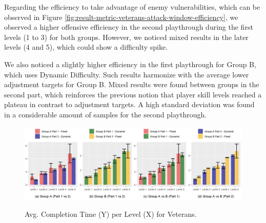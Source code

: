 Regarding the efficiency to take advantage of enemy vulnerabilities, which can be observed in Figure \ref{fig:result-metric-veterans-attack-window-efficiency}, we observed a higher offensive efficiency in the second playthrough during the first levels (1 to 3) for both groups. However, we noticed mixed results in the later levels (4 and 5), which could show a difficulty spike.

We also noticed a slightly higher efficiency in the first playthrough for Group B, which uses Dynamic Difficulty. Such results harmonize with the average lower adjustment targets for Group B. Mixed results were found between groups in the second part, which reinforces the previous notion that player skill levels reached a plateau in contrast to adjustment targets. A high standard deviation was found in a considerable amount of samples for the second playthrough.

\begin{figure}[!ht]
    \begin{center}
    \caption{Avg. Completion Time (Y) per Level (X) for Veterans.}
        \includegraphics[width=\textwidth]{figures/completion_time-veteran_players.png}
        \label{fig:result-metric-veterans-completion-time}
    \end{center}
\end{figure}

